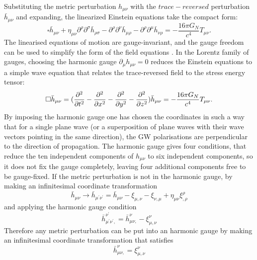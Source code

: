 \documentclass[binding=0.6cm, LaM]{sapthesis}
\begin{document}
	Substituting the metric perturbation $h_{\mu\nu}$  with the $trace-reversed$ perturbation ${\bar h}_{\mu\nu}$ and expanding, 
	the linearized Einstein equations take the compact form:
		\begin{equation}
			\square {\bar h}_{\mu\nu} + \eta_{\mu\nu}{\partial}^{\rho}{\partial}^{\sigma}{\bar h}_{\rho\sigma} - {\partial}^{\rho}{\partial}^{\nu}{\bar h}_{\mu\rho} - {\partial}^{\rho}{\partial}^{\mu}{\bar h}_{\nu\rho} = - \frac{16\pi G_{N}}{c^4}T_{\mu\nu}.
		\end{equation}
	The linearised equations of motion are gauge-invariant, and the gauge freedom can
 	be used to simplify the form of the field equations \cite{17}.
 	In the Lorentz family of gauges, choosing the harmonic gauge $ \partial_{\mu}h_{\mu\nu} = 0 $ 
	reduces the Einstein equations to a simple wave equation that relates the trace-reversed field
 	to the stress energy tensor:
		\begin{equation}
			\label{reduceinstein}
			\square {\bar h}_{\mu\nu} =({\partial^2 \over {\partial t^2} } - {\partial^2 \over {\partial x^2}}  - {\partial^2 \over {\partial y^2}}  -  {\partial^2 \over {\partial z^2}}) {\bar h}_{\mu\nu} = -{{16\pi G_{N}} \over {c^4}}T_{\mu\nu}. 
		\end{equation}
	By imposing the harmonic gauge one has chosen the coordinates in such a way that for a single plane wave 
	(or a superposition of plane waves with their wave vectors pointing in the same direction),
	the GW polarisations are perpendicular to the direction of propagation.
	The harmonic gauge gives four conditions, that reduce the ten independent components of  
	$h_{\mu\nu}$ to six independent components, so it does not fix the gauge completely,
	leaving four additional components free to be gauge-fixed.
	If the metric perturbation is not in the harmonic gauge, by making an infinitesimal coordinate transformation
		\begin{equation}
			{\bar h}_{\mu\nu} \rightarrow {\bar h}_{\mu^\prime\nu^\prime}  = {\bar h}_{\mu\nu}  - \xi_{\mu,\nu} -\xi_{\nu,\mu} + \eta_{\mu\nu}\xi^{\rho}_{,\rho}
		\end{equation}
	and applying the harmonic gauge condition
		\begin{equation}
			{\bar h}_{\mu^\prime\nu^\prime,} ^{\nu^\prime} = {\bar h}_{\mu\nu,} ^{\nu} - \xi_{\mu,\nu}^{\nu}
		\end{equation}
	Therefore any metric perturbation can be put into an harmonic gauge by making an infinitesimal 
	coordinate transformation that satisfies
		\begin{equation}
			{\bar h}_{\mu\nu,} ^{\nu} = \xi_{\mu,\nu}^{\nu}
		\end{equation}
\end{document}
